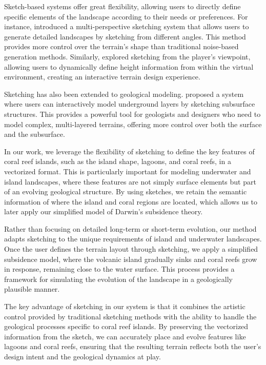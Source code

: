 Sketch-based systems offer great flexibility, allowing users to directly define specific elements of the landscape according to their needs or preferences. For instance, \citep{Gain2009} introduced a multi-perspective sketching system that allows users to generate detailed landscapes by sketching from different angles. This method provides more control over the terrain's shape than traditional noise-based generation methods. Similarly, \citep{Tasse2014} explored sketching from the player's viewpoint, allowing users to dynamically define height information from within the virtual environment, creating an interactive terrain design experience.

Sketching has also been extended to geological modeling. \citep{Patel2021} proposed a system where users can interactively model underground layers by sketching subsurface structures. This provides a powerful tool for geologists and designers who need to model complex, multi-layered terrains, offering more control over both the surface and the subsurface.

In our work, we leverage the flexibility of sketching to define the key features of coral reef islands, such as the island shape, lagoons, and coral reefs, in a vectorized format. This is particularly important for modeling underwater and island landscapes, where these features are not simply surface elements but part of an evolving geological structure. By using sketches, we retain the semantic information of where the island and coral regions are located, which allows us to later apply our simplified model of Darwin's subsidence theory.

Rather than focusing on detailed long-term or short-term evolution, our method adapts sketching to the unique requirements of island and underwater landscapes. Once the user defines the terrain layout through sketching, we apply a simplified subsidence model, where the volcanic island gradually sinks and coral reefs grow in response, remaining close to the water surface. This process provides a framework for simulating the evolution of the landscape in a geologically plausible manner.

The key advantage of sketching in our system is that it combines the artistic control provided by traditional sketching methods with the ability to handle the geological processes specific to coral reef islands. By preserving the vectorized information from the sketch, we can accurately place and evolve features like lagoons and coral reefs, ensuring that the resulting terrain reflects both the user's design intent and the geological dynamics at play.

